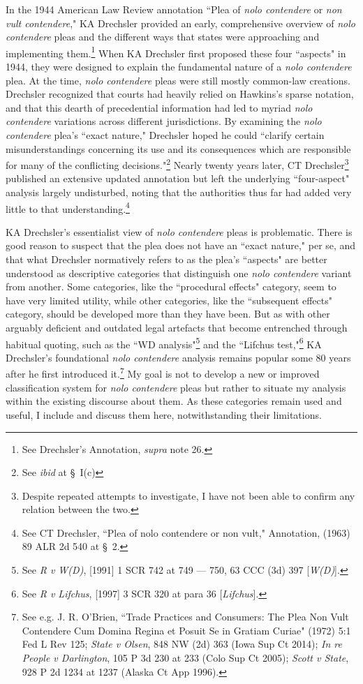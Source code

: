In the 1944 American Law Review annotation ``Plea of \textit{nolo contendere} or \textit{non vult contendere}," KA Drechsler provided an early, comprehensive overview of \textit{nolo contendere} pleas and the different ways that states were approaching and implementing them.\footnote{See Drechsler's Annotation, \textit{supra} note 26.} When KA Drechsler first proposed these four ``aspects" in 1944, they were designed to explain the fundamental nature of a \textit{nolo contendere} plea. At the time, \textit{nolo contendere} pleas were still mostly common-law creations. Drechsler recognized that courts had heavily relied on Hawkins's sparse notation, and that this dearth of precedential information had led to myriad \textit{nolo contendere} variations across different jurisdictions. By examining the \textit{nolo contendere} plea's ``exact nature," Drechsler hoped he could ``clarify certain misunderstandings concerning its use and its consequences which are responsible for many of the conflicting decisions."\footnote{See \textit{ibid} at § I(c)} Nearly twenty years later, CT Drechsler\footnote{Despite repeated attempts to investigate, I have not been able to confirm any relation between the two.} published an extensive updated annotation but left the underlying ``four-aspect" analysis largely undisturbed, noting that the authorities thus far had added very little to that understanding.\footnote{See CT Drechsler, ``Plea of nolo contendere or non vult," Annotation, (1963) 89 ALR 2d 540 at § 2.}

KA Drechsler's essentialist view of \textit{nolo contendere} pleas is problematic. There is good reason to suspect that the plea does not have an ``exact nature," per se, and that what Drechsler normatively refers to as the plea's ``aspects" are better understood as descriptive categories that distinguish one \textit{nolo contendere} variant from another. Some categories, like the ``procedural effects" category, seem to have very limited utility, while other categories, like the ``subsequent effects" category, should be developed more than they have been. But as with other arguably deficient and outdated legal artefacts that become entrenched through habitual quoting, such as the ``WD analysis"\footnote{See \textit{R v W(D)}, [1991] 1 SCR 742 at 749 — 750, 63 CCC (3d) 397 [\textit{W(D)}].} and the ``Lifchus test,"\footnote{See \textit{R v Lifchus}, [1997] 3 SCR 320 at para 36 [\textit{Lifchus}].} KA Drechsler's foundational \textit{nolo contendere} analysis remains popular some 80 years after he first introduced it.\footnote{See e.g. J. R. O'Brien, ``Trade Practices and Consumers: The Plea Non Vult Contendere Cum Domina Regina et Posuit Se in Gratiam Curiae" (1972) 5:1 Fed L Rev 125; \textit{State v Olsen}, 848 NW (2d) 363 (Iowa Sup Ct 2014); \textit{In re People v Darlington}, 105 P 3d 230 at 233 (Colo Sup Ct 2005); \textit{Scott v State}, 928 P 2d 1234 at 1237 (Alaska Ct App 1996).} My goal is not to develop a new or improved classification system for \textit{nolo contendere} pleas but rather to situate my analysis within the existing discourse about them. As these categories remain used and useful, I include and discuss them here, notwithstanding their limitations. 


